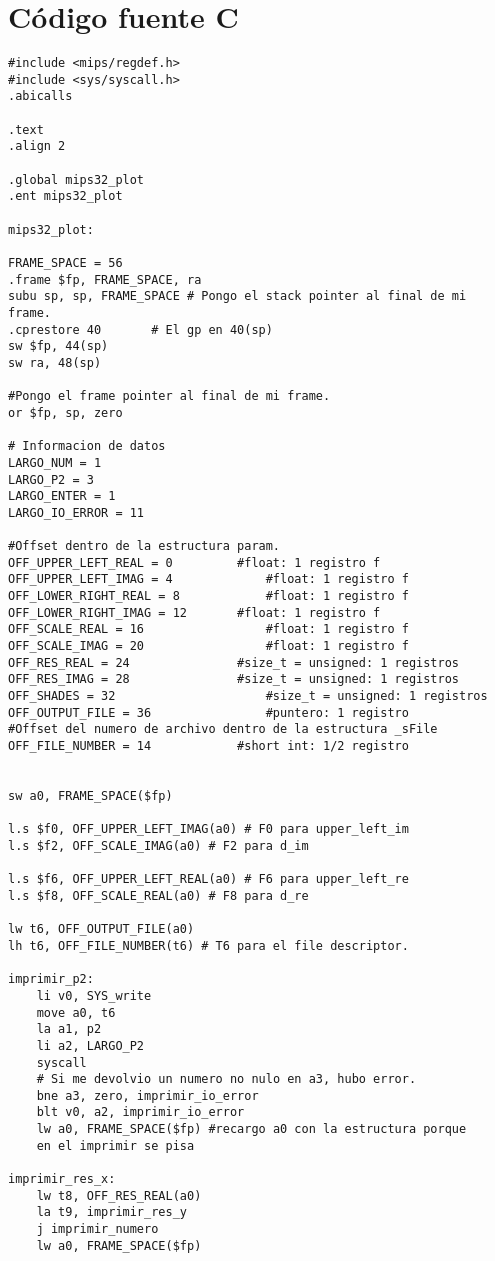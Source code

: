 \documentclass[a4paper,10pt]{article}
\begin{document}
\section{C\'odigo fuente C}

\begin{verbatim}
#include <mips/regdef.h>
#include <sys/syscall.h>
.abicalls

.text
.align 2

.global mips32_plot
.ent mips32_plot

mips32_plot:

FRAME_SPACE = 56
.frame $fp, FRAME_SPACE, ra
subu sp, sp, FRAME_SPACE # Pongo el stack pointer al final de mi frame.
.cprestore 40		# El gp en 40(sp)
sw $fp, 44(sp)
sw ra, 48(sp)

#Pongo el frame pointer al final de mi frame.
or $fp, sp, zero

# Informacion de datos
LARGO_NUM = 1
LARGO_P2 = 3
LARGO_ENTER = 1
LARGO_IO_ERROR = 11

#Offset dentro de la estructura param.
OFF_UPPER_LEFT_REAL = 0			#float: 1 registro f
OFF_UPPER_LEFT_IMAG = 4 			#float: 1 registro f
OFF_LOWER_RIGHT_REAL = 8 			#float: 1 registro f
OFF_LOWER_RIGHT_IMAG = 12 		#float: 1 registro f
OFF_SCALE_REAL = 16 				#float: 1 registro f
OFF_SCALE_IMAG = 20 				#float: 1 registro f
OFF_RES_REAL = 24 				#size_t = unsigned: 1 registros
OFF_RES_IMAG = 28 				#size_t = unsigned: 1 registros
OFF_SHADES = 32 					#size_t = unsigned: 1 registros
OFF_OUTPUT_FILE = 36 				#puntero: 1 registro
#Offset del numero de archivo dentro de la estructura _sFile
OFF_FILE_NUMBER = 14 			#short int: 1/2 registro


sw a0, FRAME_SPACE($fp)

l.s $f0, OFF_UPPER_LEFT_IMAG(a0) # F0 para upper_left_im
l.s $f2, OFF_SCALE_IMAG(a0) # F2 para d_im

l.s $f6, OFF_UPPER_LEFT_REAL(a0) # F6 para upper_left_re
l.s $f8, OFF_SCALE_REAL(a0) # F8 para d_re

lw t6, OFF_OUTPUT_FILE(a0)
lh t6, OFF_FILE_NUMBER(t6) # T6 para el file descriptor.

imprimir_p2:
	li v0, SYS_write
	move a0, t6
	la a1, p2
	li a2, LARGO_P2
	syscall
	# Si me devolvio un numero no nulo en a3, hubo error.
	bne a3, zero, imprimir_io_error
  	blt v0, a2, imprimir_io_error
	lw a0, FRAME_SPACE($fp) #recargo a0 con la estructura porque 
	en el imprimir se pisa

imprimir_res_x:
	lw t8, OFF_RES_REAL(a0)
	la t9, imprimir_res_y
	j imprimir_numero
	lw a0, FRAME_SPACE($fp)
	

\end{verbatim}
\end{document}
